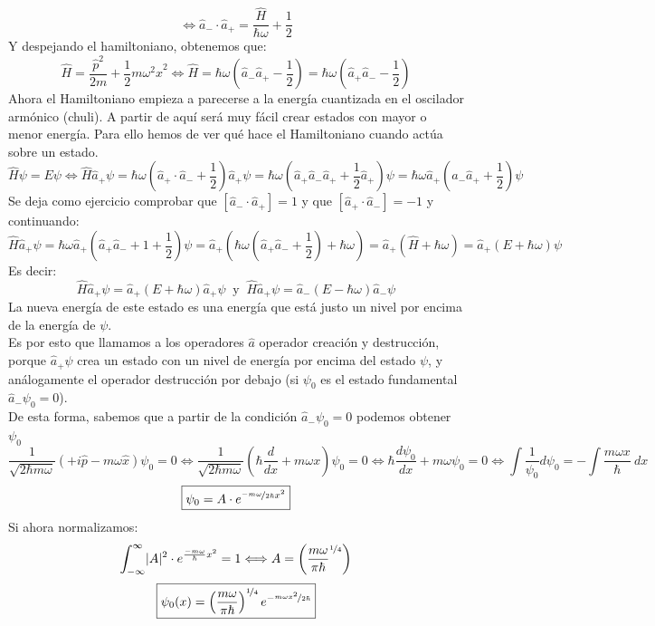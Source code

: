 \documentclass{report}
\begin{document}
    \[\Longleftrightarrow \hat{a}_-\cdot\hat{a}_+=\dfrac{\hat{H}}{\hbar\omega}+\dfrac{1}{2}\]
    Y despejando el hamiltoniano, obtenemos que:
    \begin{equation}
      \hat{H}=\dfrac{\hat{p}^2}{2m}+\dfrac12 m\omega^2\hat{x}^2\Longleftrightarrow\boxed{\hat{H}=\hbar\omega\left(\hat{a}_-\hat{a}_+-\dfrac12\right)=\hbar\omega\left(\hat{a}_+\hat{a}_--\dfrac12\right)}
    \end{equation}
    \clearpage
    \noindent Ahora el Hamiltoniano empieza a parecerse a la energía cuantizada en el oscilador armónico (chuli). A partir de aquí será muy fácil crear estados con mayor o menor energía. Para ello hemos de ver qué hace el Hamiltoniano cuando actúa sobre un estado.
    \[\hat{H}\psi=E\psi\Longleftrightarrow \hat{H}\hat{a}_+\psi=\hbar\omega\left(\hat{a}_+\cdot\hat{a}_-+\dfrac12\right)\hat{a}_+\psi=
    \hbar\omega\left(\hat{a}_+\hat{a}_-\hat{a}_+ +\dfrac12\hat{a}_+\right)\psi=\hbar\omega\hat{a}_+\left(\hat{a}_-\hat{a}_++\dfrac12\right)\psi
    \]
    \noindent Se deja como ejercicio comprobar que $\left[\hat{a}_-\cdot\hat{a}_+\right]=1$ y que $\left[\hat{a}_+\cdot\hat{a}_-\right]=-1$ y continuando:
    \[\hat{H}\hat{a}_+\psi=\hbar\omega\hat{a}_+\left(\hat{a}_+\hat{a}_-+1+\dfrac12\right)\psi=\hat{a}_+\left(\hbar\omega\left(\hat{a}_+\hat{a}_-+\dfrac12\right)+\hbar\omega\right)=
    \hat{a}_+\left(\hat{H}+\hbar\omega\right)=\hat{a}_+\left(E+\hbar\omega\right)\psi\]
    Es decir:
    \begin{equation}
      \boxed{\hat{H}\hat{a}_+\psi=\hat{a}_+\left(E+\hbar\omega\right)\hat{a}_+\psi}\ \text{ y }\ \boxed{\hat{H}\hat{a}_+\psi=\hat{a}_-\left(E-\hbar\omega\right)\hat{a}_-\psi}
    \end{equation}
    \noindent La nueva energía de este estado es una energía que está justo un nivel por encima de la energía de $\psi$. \\

    \noindent Es por esto que llamamos a los operadores $\hat{a}$ operador creación y destrucción, porque
    $\hat{a}_+\psi$ crea un estado con un nivel de energía por encima del estado $\psi$, y análogamente 
    el operador destrucción por debajo (si $\psi_0$ es el estado fundamental $\hat{a}_-\psi_0=0$).\\

    \noindent De esta forma, sabemos que a partir de la condición $\hat{a}_-\psi_0=0$ podemos obtener $\psi_0$
    \[\dfrac{1}{\sqrt{2\hbar m\omega}}\left(+i\hat{p}-m\omega\hat{x}\right)\psi_0=0 \Longleftrightarrow \dfrac{1}{\sqrt{2\hbar m\omega}}\left(\hbar\dfrac{d}{dx}+m\omega x\right)\psi_0=0
    \Longleftrightarrow \hbar\dfrac{d\psi_0}{dx}+m\omega\psi_0=0\Longleftrightarrow 
    \int\dfrac{1}{\psi_0}d\psi_0=-\int\dfrac{m\omega x}{\hbar}\ dx\]
    \[\boxed{\psi_0=A\cdot e^{\nicefrac{-m\omega}{2\hbar}x^2}}\]
    \noindent Si ahora normalizamos:
    \[\int_{-\infty}^{\infty}\lvert A\rvert^2\cdot e^{\frac{-m\omega}{\hbar}x^2}=1\Longleftrightarrow A=\left(\dfrac{m\omega}{\pi\hbar}^{\nicefrac{1}{4}}\right)\]
    \begin{equation}
      \boxed{\psi_0(x)=\left(\dfrac{m\omega}{\pi\hbar}\right)^{\nicefrac{1}{4}}e^{-\nicefrac{m\omega x^2}{2\hbar}}}
    \end{equation}
\end{document}
